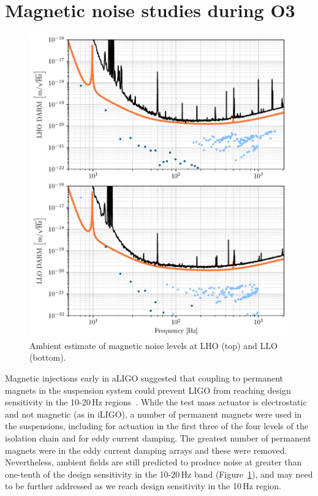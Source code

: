 \section{Magnetic noise studies during O3}\label{sec:mag}

\begin{figure}
	\centering
	\includegraphics{figures/noise-studies/mag-ambient.pdf}
	\caption{
		Ambient estimate of magnetic noise levels at LHO (top) and LLO (bottom).}
	\label{fig:mag-ambient}
\end{figure}

Magnetic injections early in \ac{aLIGO} suggested that coupling to permanent magnets in the suspension system  could prevent \ac{LIGO} from reaching design sensitivity in the 10-20\,Hz regions~\citep{Schofield_2013}.
While the test mass actuator is electrostatic and not magnetic (as in \ac{iLIGO}), a number of permanent magnets were used in the suspensions, including for actuation in the first three of the four levels of the isolation chain and for eddy current damping.
The greatest number of permanent magnets were in the eddy current damping arrays and these were removed.
Nevertheless, ambient fields are still predicted to produce noise at greater than one-tenth of the design sensitivity in the 10-20\,Hz band (Figure~\ref{fig:mag-ambient}), and may need to be further addressed as we reach design sensitivity in the 10\,Hz region.

